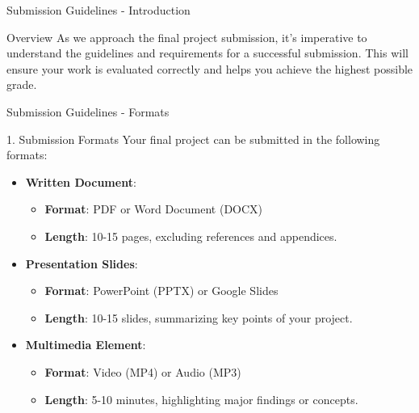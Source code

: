 \documentclass[aspectratio=169]{beamer}
\begin{document}
\begin{frame}[fragile]{Submission Guidelines - Introduction}
  \begin{block}{Overview}
    As we approach the final project submission, it's imperative to understand the guidelines and requirements for a successful submission. This will ensure your work is evaluated correctly and helps you achieve the highest possible grade.
  \end{block}
\end{frame}

\begin{frame}[fragile]{Submission Guidelines - Formats}
  \begin{block}{1. Submission Formats}
    Your final project can be submitted in the following formats:
  \end{block}
  \begin{itemize}
    \item \textbf{Written Document}: 
      \begin{itemize}
        \item \textbf{Format}: PDF or Word Document (DOCX)
        \item \textbf{Length}: 10-15 pages, excluding references and appendices.
      \end{itemize}
    \item \textbf{Presentation Slides}: 
      \begin{itemize}
        \item \textbf{Format}: PowerPoint (PPTX) or Google Slides
        \item \textbf{Length}: 10-15 slides, summarizing key points of your project.
      \end{itemize}
    \item \textbf{Multimedia Element}:
      \begin{itemize}
        \item \textbf{Format}: Video (MP4) or Audio (MP3)
        \item \textbf{Length}: 5-10 minutes, highlighting major findings or concepts.
      \end{itemize}
  \end{itemize}
\end{frame}
\end{document}
